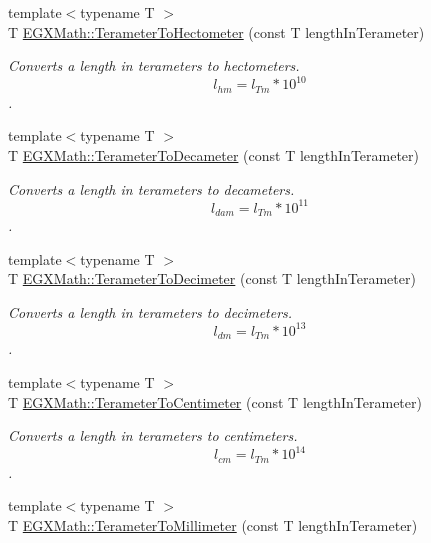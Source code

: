 \begin{DoxyCompactItemize}
{\footnotesize template$<$typename T $>$ }\\T \mbox{\hyperlink{group___e_g_x_math-_conversions-_length_conversions-_terameter-_s_i_ga8e0944895887a45b1e2218ae7a511e4f}{E\+G\+X\+Math\+::\+Terameter\+To\+Hectometer}} (const T length\+In\+Terameter)
\begin{DoxyCompactList}\small\item\em Converts a length in terameters to hectometers. \[ l_{hm}=l_{Tm} * 10^{10} \]. \end{DoxyCompactList}\item 
{\footnotesize template$<$typename T $>$ }\\T \mbox{\hyperlink{group___e_g_x_math-_conversions-_length_conversions-_terameter-_s_i_gae7e3fac4aa8882fee314a52fb4466fd2}{E\+G\+X\+Math\+::\+Terameter\+To\+Decameter}} (const T length\+In\+Terameter)
\begin{DoxyCompactList}\small\item\em Converts a length in terameters to decameters. \[ l_{dam}=l_{Tm} * 10^{11} \]. \end{DoxyCompactList}\item 
{\footnotesize template$<$typename T $>$ }\\T \mbox{\hyperlink{group___e_g_x_math-_conversions-_length_conversions-_terameter-_s_i_ga988c084c9508f38112e2e39ed74782d5}{E\+G\+X\+Math\+::\+Terameter\+To\+Decimeter}} (const T length\+In\+Terameter)
\begin{DoxyCompactList}\small\item\em Converts a length in terameters to decimeters. \[ l_{dm}=l_{Tm} * 10^{13} \]. \end{DoxyCompactList}\item 
{\footnotesize template$<$typename T $>$ }\\T \mbox{\hyperlink{group___e_g_x_math-_conversions-_length_conversions-_terameter-_s_i_gad280a7bb7ff83217a496db8168c27ee9}{E\+G\+X\+Math\+::\+Terameter\+To\+Centimeter}} (const T length\+In\+Terameter)
\begin{DoxyCompactList}\small\item\em Converts a length in terameters to centimeters. \[ l_{cm}=l_{Tm} * 10^{14} \]. \end{DoxyCompactList}\item 
{\footnotesize template$<$typename T $>$ }\\T \mbox{\hyperlink{group___e_g_x_math-_conversions-_length_conversions-_terameter-_s_i_gaff9d9c2af8681eacbb3d5d01cb9f9cfa}{E\+G\+X\+Math\+::\+Terameter\+To\+Millimeter}} (const T length\+In\+Terameter)

\end{DoxyCompactItemize}
